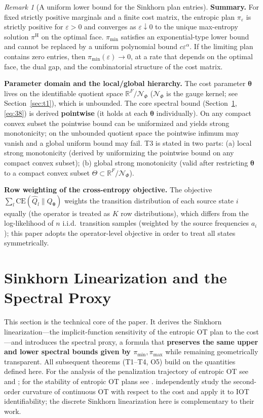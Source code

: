 \documentclass[11pt,a4paper]{article}
\theoremstyle{remark}
\newtheorem{remark}[theorem]{Remark}
\begin{document}
\begin{remark}[A uniform lower bound for the Sinkhorn plan entries]
\medskip
\noindent\textbf{Summary.} For fixed strictly positive marginals and a finite cost matrix,
the entropic plan $\pi_\varepsilon$ is strictly positive for $\varepsilon>0$ and converges
as $\varepsilon\downarrow0$ to the unique max-entropy solution $\pi^{\mathrm H}$ on the
optimal face. $\pi_{\min}$ satisfies an exponential-type lower bound and cannot be replaced
by a uniform polynomial bound $c\varepsilon^\alpha$. If the limiting plan contains zero
entries, then $\pi_{\min}(\varepsilon)\to0$, at a rate that depends on the optimal face,
the dual gap, and the combinatorial structure of the cost matrix.
\end{remark}

\textbf{Parameter domain and the local/global hierarchy.} The cost parameter $\bm{\theta}$
lives on the identifiable quotient space $\mathbb{R}^F/\mathcal{N}_\Phi$ ($\mathcal{N}_\Phi$
is the gauge kernel; see Section~\ref{sec:t1}), which is unbounded. The core spectral bound
(Section~\ref{sec:sinkhorn_linearization}, \eqref{eq:38}) is derived \textbf{pointwise}
(it holds at each $\bm{\theta}$ individually). On any compact convex subset the pointwise
bound can be uniformized and yields strong monotonicity; on the unbounded quotient space
the pointwise infimum may vanish and a global uniform bound may fail. T3 is stated in two
parts: (a) local strong monotonicity (derived by uniformizing the pointwise bound on any
compact convex subset); (b) global strong monotonicity (valid after restricting
$\bm{\theta}$ to a compact convex subset $\Theta\subset\mathbb{R}^F/\mathcal{N}_\Phi$).

\textbf{Row weighting of the cross-entropy objective.} The objective
$\sum_l\mathrm{CE}(\widehat Q_l\|Q_{\bm{\theta}})$ weights the transition distribution of
each source state $i$ equally (the operator is treated as $K$ row distributions), which
differs from the log-likelihood of $n$ i.i.d.\ transition samples (weighted by the source
frequencies $a_i$); this paper adopts the operator-level objective in order to treat all
states symmetrically.

\section{Sinkhorn Linearization and the Spectral Proxy}\label{sec:sinkhorn_linearization}

This section is the technical core of the paper. It derives the Sinkhorn
linearization---the implicit-function sensitivity of the entropic OT plan to the cost---and
introduces the spectral proxy, a formula that \textbf{preserves the same upper and lower
spectral bounds given by $\pi_{\min},\pi_{\max}$} while remaining geometrically
transparent. All subsequent theorems (T1--T4, O5) build on the quantities defined here. For
the analysis of the penalization trajectory of entropic OT see \cite{weed2018explicit} and
\cite{cominetti1994asymptotic}; for the stability of entropic OT plans see
\cite{bernton2022stability}. \cite{bartl2026} independently study the second-order
curvature of continuous OT with respect to the cost and apply it to IOT identifiability;
the discrete Sinkhorn linearization here is complementary to their work.
\end{document}
